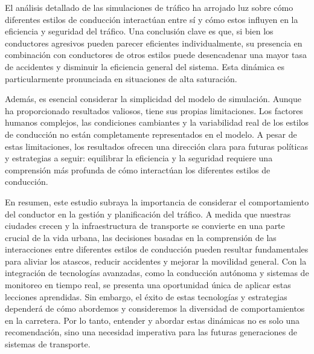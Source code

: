 El análisis detallado de las simulaciones de tráfico ha arrojado luz sobre cómo diferentes estilos de conducción interactúan entre sí y cómo estos influyen en la eficiencia y seguridad del tráfico.
Una conclusión clave es que, si bien los conductores agresivos pueden parecer eficientes individualmente, su presencia en combinación con conductores de
otros estilos puede desencadenar una mayor tasa de accidentes y disminuir la eficiencia general del sistema.
Esta dinámica es particularmente pronunciada en situaciones de alta saturación.

Además, es esencial considerar la simplicidad del modelo de simulación. Aunque ha proporcionado resultados valiosos, tiene sus propias limitaciones.
Los factores humanos complejos, las condiciones cambiantes y la variabilidad real de los estilos de conducción no están completamente representados
en el modelo. A pesar de estas limitaciones, los resultados ofrecen una dirección clara para futuras políticas y estrategias a seguir:
equilibrar la eficiencia y la seguridad requiere una comprensión más profunda de cómo interactúan los diferentes estilos de conducción.

En resumen, este estudio subraya la importancia de considerar el comportamiento del conductor en la gestión y planificación del tráfico.
A medida que nuestras ciudades crecen y la infraestructura de transporte se convierte en una parte crucial de la vida urbana, las decisiones basadas
en la comprensión de las interacciones entre diferentes estilos de conducción pueden resultar fundamentales para aliviar los atascos, reducir accidentes
y mejorar la movilidad general. Con la integración de tecnologías avanzadas, como la conducción autónoma y sistemas de monitoreo en tiempo real,
se presenta una oportunidad única de aplicar estas lecciones aprendidas. Sin embargo, el éxito de estas tecnologías y estrategias dependerá de cómo abordemos
y consideremos la diversidad de comportamientos en la carretera. Por lo tanto, entender y abordar estas dinámicas no es solo una recomendación,
sino una necesidad imperativa para las futuras generaciones de sistemas de transporte.